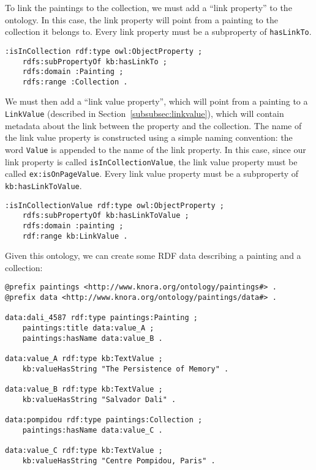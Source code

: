 \documentclass[12pt, a4paper]{article}
\begin{document}
To link the paintings to the collection, we must add a \enquote{link property} to the ontology. In this case, the link property will point from a painting to the collection it belongs to. Every link property must be a subproperty of \texttt{hasLinkTo}.

\begin{verbatim}
:isInCollection rdf:type owl:ObjectProperty ;
    rdfs:subPropertyOf kb:hasLinkTo ;
    rdfs:domain :Painting ;
    rdfs:range :Collection .
\end{verbatim}

We must then add a \enquote{link value property}, which will point from a painting to a \texttt{LinkValue} (described in Section~\ref{subsubsec:linkvalue}), which will contain metadata about the link between the property and the collection. The name of the link value property is constructed using a simple naming convention: the word \texttt{Value} is appended to the name of the link property. In this case, since our link property is called \texttt{isInCollectionValue}, the link value property must be called \texttt{ex:isOnPageValue}. Every link value property must be a subproperty of \texttt{kb:hasLinkToValue}.

\begin{verbatim}
:isInCollectionValue rdf:type owl:ObjectProperty ;
    rdfs:subPropertyOf kb:hasLinkToValue ;
    rdfs:domain :painting ;
    rdf:range kb:LinkValue .                     
\end{verbatim}

Given this ontology, we can create some RDF data describing a painting and a collection:

\begin{verbatim}
@prefix paintings <http://www.knora.org/ontology/paintings#> .
@prefix data <http://www.knora.org/ontology/paintings/data#> .

data:dali_4587 rdf:type paintings:Painting ;
    paintings:title data:value_A ;
    paintings:hasName data:value_B .

data:value_A rdf:type kb:TextValue ;
    kb:valueHasString "The Persistence of Memory" .
                
data:value_B rdf:type kb:TextValue ;
    kb:valueHasString "Salvador Dali" .
                
data:pompidou rdf:type paintings:Collection ;
    paintings:hasName data:value_C .
                
data:value_C rdf:type kb:TextValue ;
    kb:valueHasString "Centre Pompidou, Paris" .
\end{verbatim}
\end{document}
